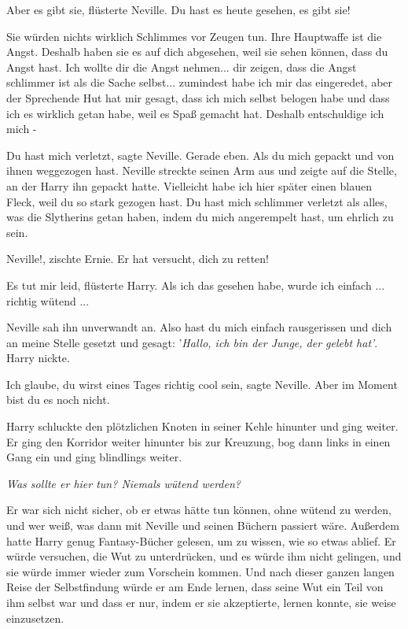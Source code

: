 \glqq Aber es gibt sie\grqq{}, flüsterte Neville. \glqq Du hast es heute
gesehen, es gibt sie!\grqq{}

\glqq Sie würden nichts wirklich Schlimmes vor Zeugen tun. Ihre Hauptwaffe ist
die Angst. Deshalb haben sie es auf dich abgesehen, weil sie sehen können, dass
du Angst hast. Ich wollte dir die Angst nehmen... dir zeigen, dass die Angst
schlimmer ist als die Sache selbst... zumindest habe ich mir das eingeredet,
aber der Sprechende Hut hat mir gesagt, dass ich mich selbst belogen habe und
dass ich es wirklich getan habe, weil es Spaß gemacht hat. Deshalb entschuldige
ich mich -\grqq{}

\glqq Du hast mich verletzt\grqq{}, sagte Neville. \glqq Gerade eben. Als du
mich gepackt und von ihnen weggezogen hast.\grqq{} Neville streckte seinen Arm
aus und zeigte auf die Stelle, an der Harry ihn gepackt hatte. \glqq Vielleicht
habe ich hier später einen blauen Fleck, weil du so stark gezogen hast. Du hast
mich schlimmer verletzt als alles, was die Slytherins getan haben, indem du mich
angerempelt hast, um ehrlich zu sein.\grqq{}

\glqq Neville!\grqq{}, zischte Ernie. \glqq Er hat versucht, dich zu
retten!\grqq{}

\glqq Es tut mir leid\grqq{}, flüsterte Harry. \glqq Als ich das gesehen habe,
wurde ich einfach ... richtig wütend ...\grqq{}

Neville sah ihn unverwandt an. \glqq Also hast du mich einfach rausgerissen und
dich an meine Stelle gesetzt und gesagt: '\emph{Hallo, ich bin der Junge, der
gelebt hat'}.\grqq{} Harry nickte.

\glqq Ich glaube, du wirst eines Tages richtig cool sein\grqq{}, sagte Neville.
\glqq Aber im Moment bist du es noch nicht.\grqq{}

Harry schluckte den plötzlichen Knoten in seiner Kehle hinunter und ging weiter.
Er ging den Korridor weiter hinunter bis zur Kreuzung, bog dann links in einen
Gang ein und ging blindlings weiter.

\emph{Was sollte er hier tun? Niemals wütend werden?}

Er war sich nicht sicher, ob er etwas hätte tun können, ohne wütend zu werden,
und wer weiß, was dann mit Neville und seinen Büchern passiert wäre. Außerdem
hatte Harry genug Fantasy-Bücher gelesen, um zu wissen, wie so etwas ablief. Er
würde versuchen, die Wut zu unterdrücken, und es würde ihm nicht gelingen, und
sie würde immer wieder zum Vorschein kommen. Und nach dieser ganzen langen Reise
der Selbstfindung würde er am Ende lernen, dass seine Wut ein Teil von ihm
selbst war und dass er nur, indem er sie akzeptierte, lernen konnte, sie weise
einzusetzen.

